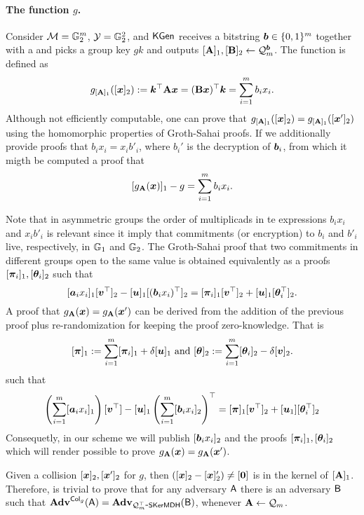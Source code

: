 \paragraph{The function $g$.} Consider $\mathcal{M}=\mathbb{G}^m_2$, $\mathcal{Y}=\mathbb{G}_2^2$, and $\mathsf{KGen}$ receives a bitstring ${\boldsymbol{b}}\in\{0,1\}^m$ together with a and picks a group key $gk$ and outputs $[\mathbf{{A}}]_1,[\mathbf{{B}}]_2\gets\mathcal{Q}_m^{\boldsymbol{b}}$. The function is defined as
$$
g_{[\mathbf{{A}}]_1}([{\boldsymbol{x}}]_2):= {\boldsymbol{k}}^\top\mathbf{{A}}{\boldsymbol{x}}=(\mathbf{{B}}{\boldsymbol{x}})^\top{\boldsymbol{k}}=\sum_{i=1}^m b_ix_i.
$$
Although not efficiently computable, one can prove that 
 $g_{[\mathbf{{A}}]_1}([{\boldsymbol{x}}]_2) = g_{[\mathbf{{A}}]_1}([{\boldsymbol{x}}']_2)$
 using the homomorphic properties of
 Groth-Sahai proofs. If we additionally provide proofs that $b_ix_i=x_ib'_i$, where $b_i'$ is the decryption of ${\boldsymbol{b}}_i$, from which it migth be computed a proof that
$$
[g_{\mathbf{{A}}}({\boldsymbol{x}})]_1-g=\sum_{i=1}^m b_ix_i.
$$

Note that in asymmetric groups the order of multiplicads in te expressions $b_ix_i$ and $x_ib'_i$ is relevant since it imply that commitments (or encryption) to $b_i$ and $b'_i$ live, respectively, in $\mathbb{G}_1$ and $\mathbb{G}_2$. The Groth-Sahai proof that two commitments in different groups open to the same value is obtained equivalently as a proofs $[{\boldsymbol{\pi}}_i]_1,[{\boldsymbol{\theta}}_i]_2$ such that
$$ 
[{\boldsymbol{a}}_ix_i]_1[{\boldsymbol{v}}^\top]_2-[{\boldsymbol{u}}]_1[({\boldsymbol{b}}_ix_i)^\top]_2 =[{\boldsymbol{\pi}}_i]_1[{\boldsymbol{v}}^\top]_2+[{\boldsymbol{u}}]_1[{\boldsymbol{\theta}}^\top_i]_2.
$$
A proof that $g_{\mathbf{{A}}}({\boldsymbol{x}}) = g_{\mathbf{{A}}}({\boldsymbol{x}}')$ can be derived from the addition of the previous proof plus re-randomization for keeping the proof zero-knowledge. That is
$$
[{\boldsymbol{\pi}}]_1 := \sum_{i=1}^m [{\boldsymbol{\pi}}_i]_1+\delta[{\boldsymbol{u}}]_1
\text{ and }
[{\boldsymbol{\theta}}]_2 := \sum_{i=1}^m [{\boldsymbol{\theta}}_i]_2-\delta[{\boldsymbol{v}}]_2.
$$
such that
$$
\left(\sum_{i=1}^m [{\boldsymbol{a}}_ix_i]_1\right)[{\boldsymbol{v}}^\top]-[{\boldsymbol{u}}]_1\left(\sum_{i=1}^m[{\boldsymbol{b}}_ix_i]_2\right)^\top =
[{\boldsymbol{\pi}}]_1[{\boldsymbol{v}}^\top]_2 + [{\boldsymbol{u}}_1][{\boldsymbol{\theta}}_i^\top]_2
$$ Consequetly, in our scheme we will publish  $[{\boldsymbol{b}}_ix_i]_2$ and the proofs $[{\boldsymbol{\pi}}_i]_1,[{\boldsymbol{\theta}}_i]_2$ which will render possible to prove $g_{\mathbf{{A}}}({\boldsymbol{x}})=g_{\mathbf{{A}}}({\boldsymbol{x}}')$.

Given a collision $[{\boldsymbol{x}}]_2,[{\boldsymbol{x}}']_2$ for $g$, then $([{\boldsymbol{x}}]_2-[{\boldsymbol{x}}]'_2)\neq [{\boldsymbol{0}}]$ is in the kernel of $[\mathbf{{A}}]_1$. Therefore, is trivial to prove that for any adversary $\mathsf{A}$ there is an adversary $\mathsf{B}$ such that $\mathbf{Adv}^{\mathsf{Col}_g}(\mathsf{A})=\mathbf{Adv}_{\mathcal{Q}_m^\top\mbox{-}\mathsf{SKerMDH}}(\mathsf{B})$, whenever $\mathbf{{A}}\gets\mathcal{Q}_m$.

